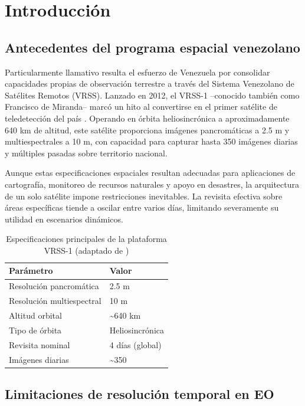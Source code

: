 \section{Introducción}

\subsection{Antecedentes del programa espacial venezolano}

Particularmente llamativo resulta el esfuerzo de Venezuela por consolidar capacidades propias de observación terrestre a través del Sistema Venezolano de Satélites Remotos (VRSS). Lanzado en 2012, el VRSS-1 --conocido también como Francisco de Miranda-- marcó un hito al convertirse en el primer satélite de teledetección del país \cite{VRSS1_2012}. Operando en órbita heliosincrónica a aproximadamente 640 km de altitud, este satélite proporciona imágenes pancromáticas a 2.5 m y multiespectrales a 10 m, con capacidad para capturar hasta 350 imágenes diarias y múltiples pasadas sobre territorio nacional.

Aunque estas especificaciones espaciales resultan adecuadas para aplicaciones de cartografía, monitoreo de recursos naturales y apoyo en desastres, la arquitectura de un solo satélite impone restricciones inevitables. La revisita efectiva sobre áreas específicas tiende a oscilar entre varios días, limitando severamente su utilidad en escenarios dinámicos. 

\begin{table}[h]
\centering
\caption{Especificaciones principales de la plataforma VRSS-1 (adaptado de \cite{VRSS1_2012})}
\label{tab:especificaciones_vrss}
\begin{tabular}{ll}
\hline
\textbf{Parámetro} & \textbf{Valor} \\
\hline
Resolución pancromática & 2.5 m \\
Resolución multiespectral & 10 m \\
Altitud orbital & \sim 640 km \\
Tipo de órbita & Heliosincrónica \\
Revisita nominal & 4 días (global) \\
Imágenes diarias & \sim 350 \\
\hline
\end{tabular}
\end{table}

\subsection{Limitaciones de resolución temporal en EO}

